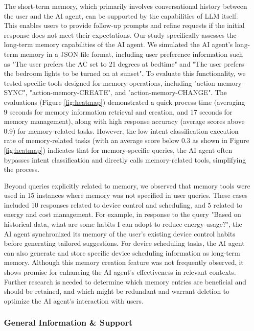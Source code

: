 \documentclass[final,3p,times]{elsarticle}
\begin{document}
The short-term memory, which primarily involves conversational history between the user and the AI agent, can be supported by the capabilities of LLM itself. This enables users to provide follow-up prompts and refine requests if the initial response does not meet their expectations. Our study specifically assesses the long-term memory capabilities of the AI agent. We simulated the AI agent’s long-term memory in a JSON file format, including user preference information such as "The user prefers the AC set to 21 degrees at bedtime" and "The user prefers the bedroom lights to be turned on at sunset". To evaluate this functionality, we tested specific tools designed for memory operations, including "action-memory-SYNC", "action-memory-CREATE", and "action-memory-CHANGE". The evaluations (Figure \ref{fig:heatmap}) demonstrated a quick process time (averaging 9 seconds for memory information retrieval and creation, and 17 seconds for memory management), along with high response accuracy (average scores above 0.9) for memory-related tasks. However, the low intent classification execution rate of memory-related tasks (with an average score below 0.3 as shown in Figure \ref{fig:heatmap}) indicates that for memory-specific queries, the AI agent often bypasses intent classification and directly calls memory-related tools, simplifying the process.

Beyond queries explicitly related to memory, we observed that memory tools were used in 15 instances where memory was not specified in user queries. These cases included 10 responses related to device control and scheduling, and 5 related to energy and cost management. For example, in response to the query "Based on historical data, what are some habits I can adopt to reduce energy usage?", the AI agent synchronized its memory of the user’s existing device control habits before generating tailored suggestions. For device scheduling tasks, the AI agent can also generate and store specific device scheduling information as long-term memory. Although this memory creation feature was not frequently observed, it shows promise for enhancing the AI agent’s effectiveness in relevant contexts. Further research is needed to determine which memory entries are beneficial and should be retained, and which might be redundant and warrant deletion to optimize the AI agent’s interaction with users.

\subsubsection{General Information \& Support}
\end{document}
